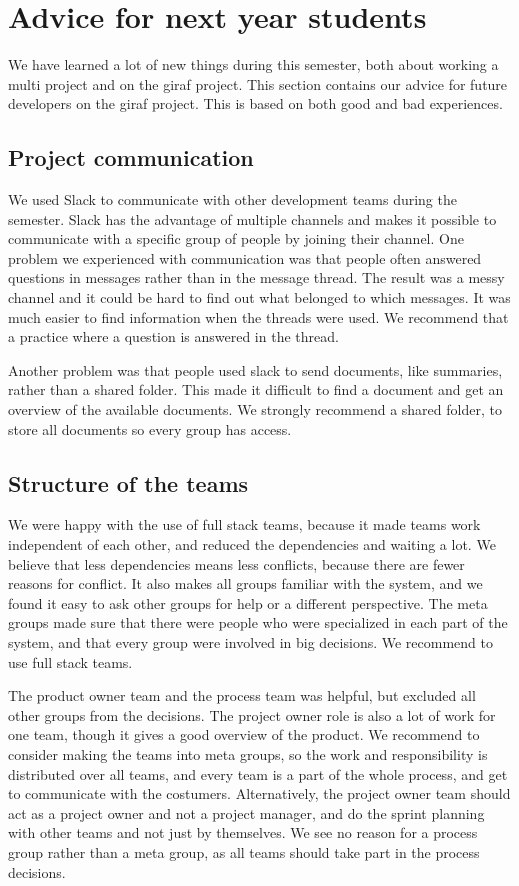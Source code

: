 \section{Advice for next year students}

We have learned a lot of new things during this semester, both about working a multi project and on the \gls{giraf} project. This section contains our advice for future developers on the \gls{giraf} project. This is based on both good and bad experiences. 

\subsection{Project communication}
We used Slack to communicate with other development teams during the semester. Slack has the advantage of multiple channels and makes it possible to communicate with a specific group of people by joining their channel. One problem we experienced with communication was that people often answered questions in messages rather than in the message thread. The result was a messy channel and it could be hard to find out what belonged to which messages. It was much easier to find information when the threads were used. We recommend that a practice where a question is answered in the thread. 

Another problem was that people used slack to send documents, like summaries, rather than a shared folder. This made it difficult to find a document and get an overview of the available documents. We strongly recommend a shared folder, to store all documents so every group has access. 

\subsection{Structure of the teams}
We were happy with the use of full stack teams, because it made teams work independent of each other, and reduced the dependencies and waiting a lot. We believe that less dependencies means less conflicts, because there are fewer reasons for conflict. It also makes all groups familiar with the system, and we found it easy to ask other groups for help or a different perspective. The meta groups made sure that there were people who were specialized in each part of the system, and that every group were involved in big decisions. We recommend to use full stack teams. 

The product owner team and the process team was helpful, but excluded all other groups from the decisions. The project owner role is also a lot of work for one team, though it gives a good overview of the product. We recommend to consider making the teams into meta groups, so the work and responsibility is distributed over all teams, and every team is a part of the whole process, and get to communicate with the costumers. Alternatively, the project owner team should act as a project owner and not a project manager, and do the sprint planning with other teams and not just by themselves. We see no reason for a process group rather than a meta group, as all teams should take part in the process decisions. 

